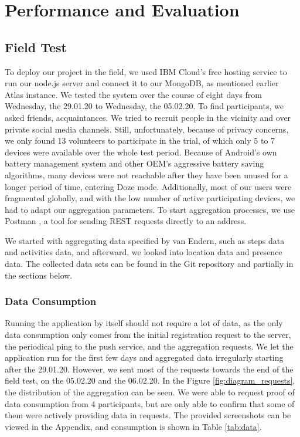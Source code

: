 
\chapter{Performance and Evaluation}\label{chapter:evaluation}
\section{Field Test}\label{sec:field_test}
To deploy our project in the field, we used IBM Cloud's free hosting service to run our node.js server and connect it to our MongoDB, as mentioned earlier Atlas instance. We tested the system over the course of eight days from Wednesday, the 29.01.20 to Wednesday, the 05.02.20. To find participants, we asked friends, acquaintances. We tried to recruit people in the vicinity and over private social media channels. Still, unfortunately, because of privacy concerns, we only found 13 volunteers to participate in the trial, of which only 5 to 7 devices were available over the whole test period. Because of Android's own battery management system and other OEM's aggressive battery saving algorithms, many devices were not reachable after they have been unused for a longer period of time, entering Doze mode. Additionally, most of our users were fragmented globally, and with the low number of active participating devices, we had to adapt our aggregation parameters. To start aggregation processes, we use Postman \cite{postman}, a tool for sending REST requests directly to an address.

We started with aggregating data specified by van Endern, such as steps data and activities data, and afterward, we looked into location data and presence data. The collected data sets can be found in the Git repository \cite{results} and partially in the sections below.

\subsection{Data Consumption}
Running the application by itself should not require a lot of data, as the only data consumption only comes from the initial registration request to the server, the periodical ping to the push service, and the aggregation requests. We let the application run for the first few days and aggregated data irregularly starting after the 29.01.20. However, we sent most of the requests towards the end of the field test, on the 05.02.20 and the 06.02.20. In the Figure \ref{fig:diagram_requests}, the distribution of the aggregation can be seen. We were able to request proof of data consumption from 4 participants, but are only able to confirm that some of them were actively providing data in requests. The provided screenshots can be viewed in the Appendix, and consumption is shown in Table \ref{tab:data}. 

